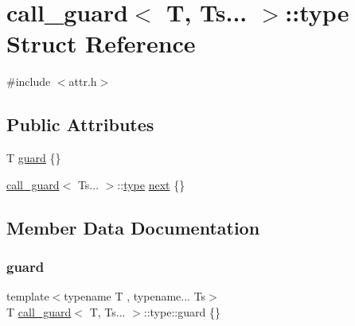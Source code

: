 \hypertarget{structcall__guard_3_01_t_00_01_ts_8_8_8_01_4_1_1type}{}\section{call\+\_\+guard$<$ T, Ts... $>$\+::type Struct Reference}
\label{structcall__guard_3_01_t_00_01_ts_8_8_8_01_4_1_1type}


{\ttfamily \#include $<$attr.\+h$>$}

\subsection*{Public Attributes}
\begin{DoxyCompactItemize}
\item 
T \mbox{\hyperlink{structcall__guard_3_01_t_00_01_ts_8_8_8_01_4_1_1type_a19974a1b536a98e1fe614c23f19a01f8}{guard}} \{\}
\item 
\mbox{\hyperlink{structcall__guard}{call\+\_\+guard}}$<$ Ts... $>$\+::\mbox{\hyperlink{_s_d_l__opengl_8h_ad5ddf6fca7b585646515660e810e0188}{type}} \mbox{\hyperlink{structcall__guard_3_01_t_00_01_ts_8_8_8_01_4_1_1type_a564cac6ee0a43667bb1e1ea0cd1181b7}{next}} \{\}
\end{DoxyCompactItemize}


\subsection{Member Data Documentation}
\mbox{\label{structcall__guard_3_01_t_00_01_ts_8_8_8_01_4_1_1type_a19974a1b536a98e1fe614c23f19a01f8}} 
\subsubsection{\texorpdfstring{guard}{guard}}
{\footnotesize\ttfamily template$<$typename T , typename... Ts$>$ \\
T \mbox{\hyperlink{structcall__guard}{call\+\_\+guard}}$<$ T, Ts... $>$\+::type\+::guard \{\}}

\mbox{\label{structcall__guard_3_01_t_00_01_ts_8_8_8_01_4_1_1type_a564cac6ee0a43667bb1e1ea0cd1181b7}} 
